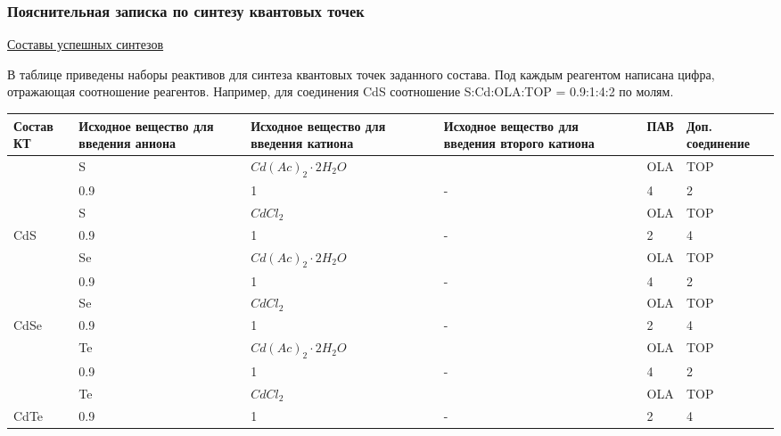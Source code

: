 \subsubsection*{Пояснительная записка по синтезу квантовых точек}

\underline{Составы успешных синтезов}

В таблице приведены наборы реактивов для синтеза квантовых точек заданного состава. Под каждым реагентом написана цифра, отражающая соотношение реагентов. Например, для соединения CdS соотношение S:Cd:OLA:TOP = 0.9:1:4:2 по молям.

\begin{longtable}{|p{2cm}|p{2.5cm}|p{3cm}|p{3cm}|p{1.5cm}|p{2cm}|}
    \hline
    Состав КТ & Исходное вещество для введения аниона & Исходное вещество для введения катиона & Исходное вещество для введения второго катиона & ПАВ & Доп. соединение \\ 
    \hline
     & \cellcolor[HTML]{C0C0C0}S & \cellcolor[HTML]{C0C0C0}$Cd(Ac)_2 \cdot 2H_2O$ & \cellcolor[HTML]{C0C0C0} & \cellcolor[HTML]{C0C0C0}OLA & \cellcolor[HTML]{C0C0C0}TOP \\ \cline{2-3} \cline{5-6} 
     & 0.9 & 1 & \multirow{-2}{*}{\cellcolor[HTML]{C0C0C0}-} & 4 & 2 \\ 
     \cline{2-6} 
     & \cellcolor[HTML]{C0C0C0}S & \cellcolor[HTML]{C0C0C0}$CdCl_2$ & \cellcolor[HTML]{C0C0C0} & \cellcolor[HTML]{C0C0C0}OLA & \cellcolor[HTML]{C0C0C0}TOP \\ 
     \cline{2-3} \cline{5-6} 
    \multirow{-4}{*}{CdS} & 0.9 & 1 & \multirow{-2}{*}{\cellcolor[HTML]{C0C0C0}-} & 2 & 4 \\ 
    \hline

    & \cellcolor[HTML]{C0C0C0}Se & \cellcolor[HTML]{C0C0C0}$Cd(Ac)_2 \cdot 2H_2O$ & \cellcolor[HTML]{C0C0C0} & \cellcolor[HTML]{C0C0C0}OLA & \cellcolor[HTML]{C0C0C0}TOP \\ \cline{2-3} \cline{5-6} 
     & 0.9 & 1 & \multirow{-2}{*}{\cellcolor[HTML]{C0C0C0}-} & 4 & 2 \\ 
     \cline{2-6} 
     & \cellcolor[HTML]{C0C0C0}Se & \cellcolor[HTML]{C0C0C0}$CdCl_2$ & \cellcolor[HTML]{C0C0C0} & \cellcolor[HTML]{C0C0C0}OLA & \cellcolor[HTML]{C0C0C0}TOP \\ 
     \cline{2-3} \cline{5-6} 
    \multirow{-4}{*}{CdSe} & 0.9 & 1 & \multirow{-2}{*}{\cellcolor[HTML]{C0C0C0}-} & 2 & 4 \\ 
    \hline

    & \cellcolor[HTML]{C0C0C0}Te & \cellcolor[HTML]{C0C0C0}$Cd(Ac)_2 \cdot 2H_2O$ & \cellcolor[HTML]{C0C0C0} & \cellcolor[HTML]{C0C0C0}OLA & \cellcolor[HTML]{C0C0C0}TOP \\ \cline{2-3} \cline{5-6} 
     & 0.9 & 1 & \multirow{-2}{*}{\cellcolor[HTML]{C0C0C0}-} & 4 & 2 \\ 
     \cline{2-6} 
     & \cellcolor[HTML]{C0C0C0}Te & \cellcolor[HTML]{C0C0C0}$CdCl_2$ & \cellcolor[HTML]{C0C0C0} & \cellcolor[HTML]{C0C0C0}OLA & \cellcolor[HTML]{C0C0C0}TOP \\ 
     \cline{2-3} \cline{5-6} 
    \multirow{-4}{*}{CdTe} & 0.9 & 1 & \multirow{-2}{*}{\cellcolor[HTML]{C0C0C0}-} & 2 & 4 \\ 
    \hline


\end{longtable}
